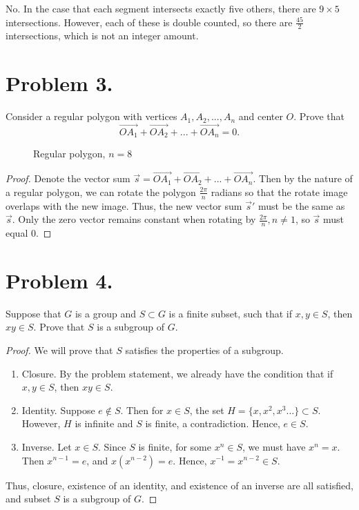 \documentclass{article}
\begin{document}
\par No. In the case that each segment intersects exactly five others, there are $9\times 5$ intersections. However, each of these is double counted, so there are $\frac{45}{2}$ intersections, which is not an integer amount.

\section{Problem 3.}
Consider a regular polygon with vertices $A_1,A_2,...,A_n$ and center $O$. Prove that 
\[\overrightarrow{OA_1}+\overrightarrow{OA_2}+...+\overrightarrow{OA_n}=0.\]

\begin{figure}[h]
    \centering
    
    \caption{Regular polygon, $n=8$}
\end{figure}

\begin{proof}
Denote the vector sum $\overrightarrow{s}=\overrightarrow{OA_1}+\overrightarrow{OA_2}+...+\overrightarrow{OA_n}$. Then by the nature of a regular polygon, we can rotate the polygon $\frac{2\pi}{n}$ radians so that the rotate image overlaps with the new image. Thus, the new vector sum $\overrightarrow{s}'$ must be the same as $\overrightarrow{s}$. Only the zero vector remains constant when rotating by $\frac{2\pi}{n}, n\neq 1$, so $\overrightarrow{s}$ must equal $0$.
\end{proof}


\section{Problem 4.}
Suppose that $G$ is a group and $S\subset G$ is a finite subset, such that if $x,y\in S$, then $xy\in S$. Prove that $S$ is a subgroup of $G$.
\begin{proof}
We will prove that $S$ satisfies the properties of a subgroup.
\begin{enumerate}[label=(\arabic*)]
    \item Closure. By the problem statement, we already have the condition that if $x,y\in S$, then $xy\in S$.
    \item Identity. Suppose $e\notin S$. Then for $x\in S$, the set $H=\{x, x^2, x^3\dots \}\subset S$. However, $H$ is infinite and $S$ is finite, a contradiction. Hence, $e\in S$.
    \item Inverse. Let $x\in S$. Since $S$ is finite, for some $x^n \in S$, we must have $x^n=x$. Then $x^{n-1}=e$, and $x(x^{n-2})=e$. Hence, $x^{-1}=x^{n-2}\in S$.
\end{enumerate}
\par Thus, closure, existence of an identity, and existence of an inverse are all satisfied, and subset $S$ is a subgroup of $G$.
\end{proof}
\end{document}
